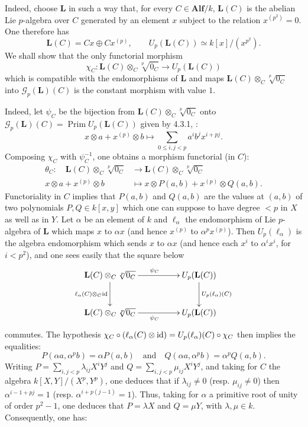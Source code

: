 Indeed, choose $\mathbf L$ in such a way that, for every $C\in\mathbf{Alf}/k$, $\mathbf L(C)$ is the abelian Lie $p$-algebra over $C$ generated by an element $x$ subject to the relation $x^{(p^2)}=0$. One therefore has
\[
\mathbf L(C)=Cx\oplus Cx^{(p)},\qquad U_p(\mathbf L(C))\simeq k[x]/(x^{p^2}).
\]
We shall show that the only functorial morphism
\[
\chi_C:\mathbf L(C)\otimes_C\sqrt[p]{0_C}\longrightarrow U_p(\mathbf L(C))
\]
which is compatible with the endomorphisms of $\mathbf L$ and maps $\mathbf L(C)\otimes_C\sqrt[p]{0_C}$ into $\mathscr G_p(\mathbf L)(C)$ is the constant morphism with value $1$.

Indeed, let $\psi_C$ be the bijection from $\mathbf L(C)\otimes_C\sqrt[p]{0_C}$ onto $\mathscr G_p(\mathbf L)(C)=\operatorname{Prim}U_p(\mathbf L(C))$ given by 4.3.1, \ie:
\[
x\otimes a+x^{(p)}\otimes b\longmapsto\sum_{0\le i,j<p}a^ib^jx^{i+pj}.
\]
Composing $\chi_C$ with $\psi_C^{-1}$, one obtains a morphism functorial (in $C$):
\[
\begin{aligned}
\theta_C:\quad\mathbf L(C)\otimes_C\sqrt[p]{0_C}&\longrightarrow\mathbf L(C)\otimes_C\sqrt[p]{0_C}\\
x\otimes a+x^{(p)}\otimes b&\longmapsto x\otimes P(a,b)+x^{(p)}\otimes Q(a,b).
\end{aligned}
\]
Functoriality in $C$ implies that $P(a,b)$ and $Q(a,b)$ are the values at $(a,b)$ of two polynomials $P,Q\in k[x,y]$ which one can suppose to have degree $<p$ in $X$ as well as in $Y$. Let $\alpha$ be an element of $k$ and $\ell_\alpha$ the endomorphism of Lie $p$-algebra of $\mathbf L$ which maps $x$ to $\alpha x$ (and hence $x^{(p)}$ to $\alpha^px^{(p)}$). Then $U_p(\ell_\alpha)$ is the algebra endomorphism which sends $x$ to $\alpha x$ (and hence each $x^i$ to $\alpha^ix^i$, for $i<p^2$), and one sees easily that the square below
\[
\xymatrix@C=50pt@R=28pt{
\mathbf L(C)\otimes_C\sqrt[p]{0_C}\ar[r]^{\psi_C}\ar[d]_{\ell_\alpha(C)\otimes_C\id}&U_p(\mathbf L(C))\ar[d]^{U_p(\ell_\alpha)(C)}\\
\mathbf L(C)\otimes_C\sqrt[p]{0_C}\ar[r]_{\psi_C}&U_p(\mathbf L(C))}
\]
commutes. The hypothesis $\chi_C\circ(\ell_\alpha(C)\otimes\mathrm{id})=U_p(\ell_\alpha)(C)\circ\chi_C$ then implies the equalities:
\[
P(\alpha a,\alpha^pb)=\alpha P(a,b)\quad\text{and}\quad Q(\alpha a,\alpha^pb)=\alpha^pQ(a,b).
\]
Writing $P=\sum_{i,j<p}\lambda_{ij}X^iY^j$ and $Q=\sum_{i,j<p}\mu_{ij}X^iY^j$, and taking for $C$ the algebra $k[X,Y]/(X^p,Y^p)$, one deduces that if $\lambda_{ij}\ne0$ (resp. $\mu_{ij}\ne0$) then $\alpha^{i-1+pj}=1$ (resp. $\alpha^{i+p(j-1)}=1$). Thus, taking for $\alpha$ a primitive root of unity of order $p^2-1$, one deduces that $P=\lambda X$ and $Q=\mu Y$, with $\lambda,\mu\in k$. Consequently, one has:
